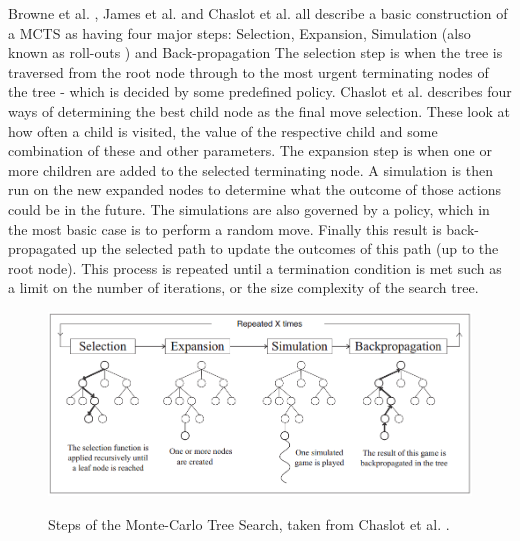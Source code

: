 \documentclass [11pt]{article}
\begin{document}
	\noindent Browne et al. \cite{survey}, James et al. \cite{wits} and Chaslot et al. \cite{progressive} all describe a basic construction of a MCTS as having four major steps: Selection, Expansion, Simulation (also known as roll-outs \cite{wits}) and Back-propagation The selection step is when the tree is traversed from the root node through to the most urgent terminating nodes of the tree - which is decided by some predefined policy. Chaslot et al. \cite{progressive} describes four ways of determining the best child node as the final move selection. These look at how often a child is visited, the value of the respective child and some combination of these and other parameters. The expansion step is when one or more children are added to the selected terminating node. A simulation is then run on the new expanded nodes to determine what the outcome of those actions could be in the future. The simulations are also governed by a policy, which in the most basic case is to perform a random move. Finally this result is back-propagated up the selected path to update the outcomes of this path (up to the root node). This process is repeated until a termination condition is met such as a limit on the number of iterations, or the size complexity of the search tree.
	\\
	\begin{figure}[H]
		\includegraphics[width=\textwidth]{mcts}\\
		\centering
		\caption{Steps of the Monte-Carlo Tree Search, taken from Chaslot et al. \cite{MCTS_begin}.}
		\label{mcts}
	\end{figure}
	
\end{document}
